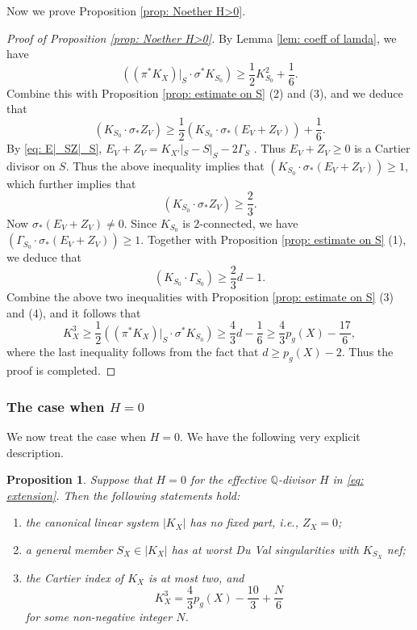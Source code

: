 \documentclass[a4paper,11pt]{amsart}
\newcommand{\QQ}{\ensuremath{\mathbb{Q}}}
\newtheorem{prop}[thm]{Proposition}
\theoremstyle{definition}
\theoremstyle{remark}
\numberwithin{equation}{section}
\begin{document}
Now we prove Proposition \ref{prop: Noether H>0}.
\begin{proof} [Proof of Proposition \ref{prop: Noether H>0}]
	By Lemma \ref{lem: coeff of lamda}, we have
	$$
	\left((\pi^*K_X)|_S \cdot \sigma^*K_{S_0}\right) \ge \frac{1}{2} K_{S_0}^2 + \frac{1}{6}.
	$$
	Combine this with Proposition \ref{prop: estimate on S} (2) and (3), and we deduce that
	$$
	(K_{S_0} \cdot \sigma_*Z_V) \ge \frac{1}{2} \left(K_{S_0} \cdot \sigma_*(E_V + Z_V)\right) + \frac{1}{6}.
	$$
	By \eqref{eq: E|_SZ|_S}, $E_V + Z_V = K_{X'}|_S - S|_S - 2\Gamma_S$ . Thus $E_V + Z_V \ge 0$ is a Cartier divisor on $S$. Thus the above inequality implies that $\left(K_{S_0} \cdot \sigma_*(E_V+Z_V) \right) \ge 1$, which further implies that 
	$$
	(K_{S_0} \cdot \sigma_*Z_V) \ge \frac{2}{3}.
	$$
	Now $\sigma_*(E_V+Z_V) \ne 0$. Since $K_{S_0}$ is $2$-connected, we have $\left(\Gamma_{S_0} \cdot \sigma_*(E_V+Z_V) \right) \ge 1$. Together with Proposition \ref{prop: estimate on S} (1), we deduce that
	$$
	(K_{S_0} \cdot \Gamma_{S_0}) \ge \frac{2}{3} d - 1.
	$$
	Combine the above two inequalities with Proposition \ref{prop: estimate on S} (3) and (4), and it follows that 
	$$
	K_X^3 \ge \frac{1}{2} \left((\pi^*K_X)|_S \cdot \sigma^*K_{S_0}\right) \ge \frac{4}{3} d - \frac{1}{6} \ge \frac{4}{3} p_g(X) - \frac{17}{6},
	$$
	where the last inequality follows from the fact that $d \ge p_g(X) - 2$. Thus the proof is completed.
\end{proof}

\subsubsection{The case when $H=0$} We now treat the case when $H = 0$. We have the following very explicit description.

\begin{prop}\label{prop: Noether H=0}
	Suppose that $H=0$ for the effective $\QQ$-divisor $H$ in \eqref{eq: extension}. Then the following statements hold:
	\begin{enumerate}
		\item[(1)] the canonical linear system $|K_X|$ has no fixed part, i.e., $Z_X=0$;
		\item[(2)] a general member $S_X \in |K_X|$ has at worst Du Val singularities with $K_{S_X}$ nef;
		\item[(3)] the Cartier index of $K_X$ is at most two, and
		$$
		K_X^3 = \frac{4}{3}p_g(X)-\frac{10}{3}+\frac{N}{6}
		$$ 
		for some non-negative integer $N$.
	\end{enumerate}
\end{prop}
\end{document}

